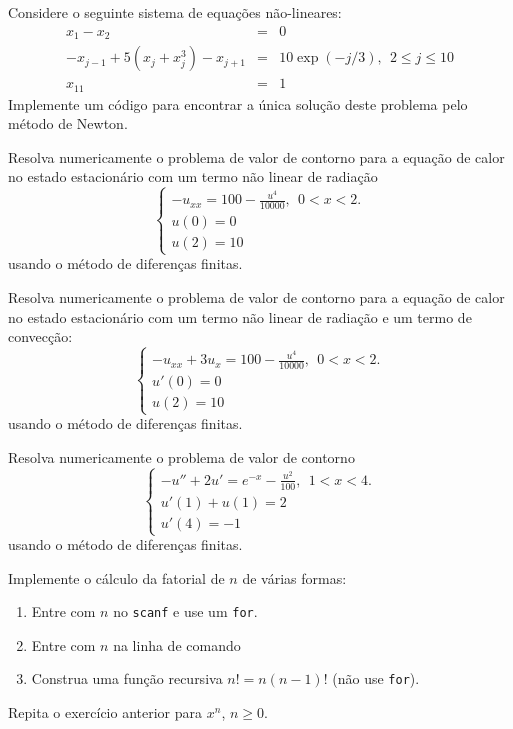\begin{exer}{\label{sis_nao_linear}}  Considere o seguinte sistema de equações não-lineares:
\begin{eqnarray}
x_1-x_2&=&0\nonumber\\
-x_{j-1}+5(x_j+x_j^3)-x_{j+1}&=&10\exp(-j/3),~~ 2\leq j \leq 10\nonumber\\
x_{11}&=&1
\end{eqnarray}
Implemente um código para encontrar a única solução deste problema pelo método de Newton.

\end{exer}


\begin{exer}\label{exerc_14.1}Resolva numericamente o problema de valor de contorno para a equação de calor no estado estacionário com um termo não linear de radiação
$$\left\{\begin{array}{l}-u_{xx}=100- \frac{u^4}{10000},~~ 0<x<2.\\
u(0)=0\\
u(2)=10\end{array}
\right.
$$
usando o método de diferenças finitas.
\end{exer}


\begin{exer}Resolva numericamente o problema de valor de contorno para a equação de calor no estado estacionário com um termo não linear de radiação e um termo de convecção:
$$\left\{\begin{array}{l}-u_{xx}+3u_x=100- \frac{u^4}{10000},~~ 0<x<2.\\
u'(0)=0\\
u(2)=10\end{array}
\right.
$$
usando o método de diferenças finitas.
\end{exer}

\begin{exer} Resolva numericamente o problema de valor de contorno
$$\left\{\begin{array}{l}-u''+2u'=e^{-x}- \frac{u^2}{100},~~ 1<x<4.\\
u'(1)+u(1)=2\\
u'(4)=-1\end{array}
\right.
$$
usando o método de diferenças finitas.
\end{exer}


\begin{exer}
Implemente o cálculo da fatorial de $n$ de várias formas:
\begin{enumerate}
 \item Entre com $n$ no \verb|scanf| e use um \verb|for|.
 \item Entre com $n$ na linha de comando
 \item Construa uma função recursiva $n!=n(n-1)!$ (não use \verb|for|).
 \end{enumerate}
\end{exer}
\begin{exer}
Repita o exercício anterior para $x^n$, $n\geq 0$.
\end{exer}

